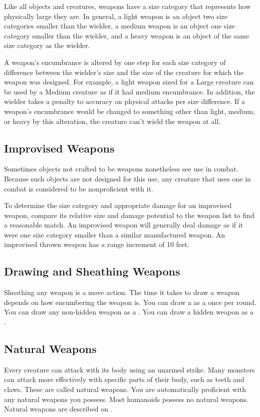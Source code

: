              Like all objects and creatures, weapons have a size category that represents how physically large they are. In general, a light weapon is an object two size categories smaller than the wielder, a medium weapon is an object one size category smaller than the wielder, and a heavy weapon is an object of the same size category as the wielder.

             A weapon's encumbrance is altered by one step for each size category of difference between the wielder's size and the size of the creature for which the weapon was designed. For example, a light weapon sized for a Large creature can be used by a Medium creature as if it had medium encumbrance. In addition, the wielder takes a  penalty to accuracy on physical attacks per size difference. If a weapon's encumbrance would be changed to something other than light, medium, or heavy by this alteration, the creature can't wield the weapon at all.

    \subsection{Improvised Weapons}\label{Improvised Weapons} Sometimes objects not crafted to be weapons nonetheless see use in combat. Because such objects are not designed for this use, any creature that uses one in combat is considered to be nonproficient with it.

        To determine the size category and appropriate damage for an improvised weapon, compare its relative size and damage potential to the weapon list to find a reasonable match. An improvised weapon will generally deal damage as if it were one size category smaller than a similar manufactured weapon. An improvised thrown weapon has a range increment of 10 feet.

    \subsection{Drawing and Sheathing Weapons}\label{Drawing and Sheathing Weapons}
        Sheathing any weapon is a move action.
        The time it takes to draw a weapon depends on how encumbering the weapon is.
        You can draw a  as a  once per round.
        You can draw any non-hidden weapon as a .
        You can draw a hidden weapon as a .

    \subsection{Natural Weapons}\label{Natural Weapons}
        Every creature can attack with its body using an unarmed strike. Many monsters can attack more effectively with specific parts of their body, such as teeth and claws. These are called natural weapons. You are automatically proficient with any natural weapons you possess. Most humanoids possess no natural weapons. Natural weapons are described on .

